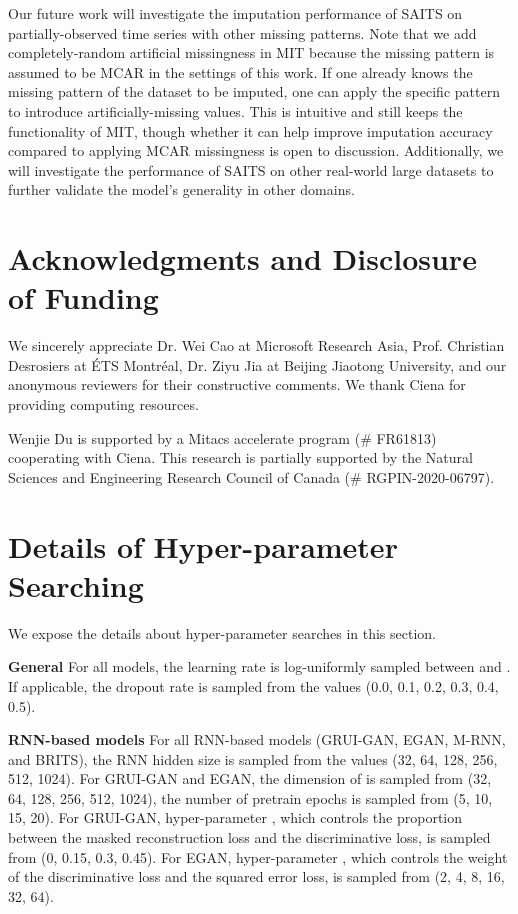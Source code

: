 \documentclass{article}
\begin{document}
Our future work will investigate the imputation performance of SAITS on partially-observed time series with other missing patterns. Note that we add completely-random artificial missingness in MIT because the missing pattern is assumed to be MCAR in the settings of this work. If one already knows the missing pattern of the dataset to be imputed, one can apply the specific pattern to introduce artificially-missing values. This is intuitive and still keeps the functionality of MIT, though whether it can help improve imputation accuracy compared to applying MCAR missingness is open to discussion. Additionally, we will investigate the performance of SAITS on other real-world large datasets to further validate the model's generality in other domains.

\section*{Acknowledgments and Disclosure of Funding}
We sincerely appreciate Dr. Wei Cao at Microsoft Research Asia, Prof. Christian Desrosiers at \'ETS Montr\'eal, Dr. Ziyu Jia at Beijing Jiaotong University, and our anonymous reviewers for their constructive comments.
We thank Ciena for providing computing resources.

Wenjie Du is supported by a Mitacs accelerate program (\# FR61813) cooperating with Ciena.
This research is partially supported by the Natural Sciences and Engineering Research Council of Canada (\# RGPIN-2020-06797).

\clearpage





\clearpage
\appendix
\section{Details of Hyper-parameter Searching}\label{appendix: hyper-parameter search}
We expose the details about hyper-parameter searches in this section.

\textbf{General} \hspace{1em} 
For all models, the learning rate is log-uniformly sampled between  and . If applicable, the dropout rate is sampled from the values (0.0, 0.1, 0.2, 0.3, 0.4, 0.5).

\textbf{RNN-based models} \hspace{1em} 
For all RNN-based models (GRUI-GAN, EGAN, M-RNN, and BRITS), the RNN hidden size is sampled from the values (32, 64, 128, 256, 512, 1024). For GRUI-GAN and EGAN, the dimension of  is sampled from (32, 64, 128, 256, 512, 1024), the number of pretrain epochs is sampled from (5, 10, 15, 20). For GRUI-GAN, hyper-parameter , which controls the proportion between the masked reconstruction loss and the discriminative loss, is sampled from (0, 0.15, 0.3, 0.45). For EGAN, hyper-parameter , which controls the weight of the discriminative loss and the squared error loss, is sampled from (2, 4, 8, 16, 32, 64).
\end{document}
